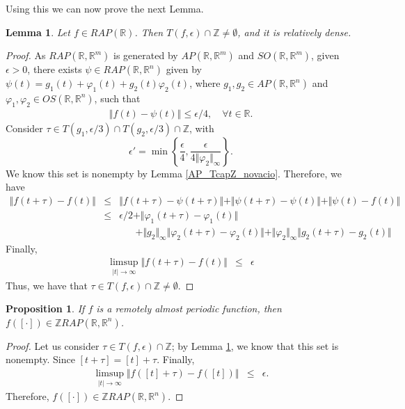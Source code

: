 \documentclass[english,,reqno]{amsart}
\numberwithin{equation}{section}
\theoremstyle{plain}
\newtheorem{lem}[thm]{Lemma}
\newtheorem{prop}[thm]{Proposition}
\theoremstyle{definition}
\theoremstyle{remark}
\begin{document}
Using this we can now prove the next Lemma.
\begin{lem}\label{RAP_TcapZ_novacio}
Let $f \in RAP(\mathbb{R})$. Then $T(f,\epsilon) \cap \mathbb{Z} \neq \emptyset$, and it is relatively dense.
\end{lem}
\begin{proof}
As $RAP(\mathbb{R},\mathbb{R}^{m})$ is generated by $AP(\mathbb{R},\mathbb{R}^{m})$ and $SO(\mathbb{R},\mathbb{R}^{m})$, given $\epsilon > 0$, there exists $\psi\in RAP(\mathbb{R},\mathbb{R}^n)$ given by $\psi(t) = g_1(t) + \varphi_1(t) + g_2(t)\varphi_2(t)$,  
where $g_1, g_2 \in AP(\mathbb{R}, \mathbb{R}^n)$ and $\varphi_1, \varphi_2 \in OS(\mathbb{R}, \mathbb{R}^n)$, such that  
\begin{eqnarray*}
\left\Vert f(t) - \psi(t) \right\Vert \leq \epsilon / 4, \quad \forall t\in \mathbb{R}.
\end{eqnarray*}  
Consider $\tau \in T(g_1, \epsilon/3) \cap T(g_2, \epsilon/3) \cap \mathbb{Z}$, with  
\[
\epsilon' = \min\left\{ \frac{\epsilon}{4}, \frac{\epsilon}{4\Vert \varphi_2\Vert_{\infty}} \right\}.
\]  
We know this set is nonempty by Lemma \ref{AP_TcapZ_novacio}.  
Therefore, we have
\begin{eqnarray*}
\Vert f(t+\tau)-f(t) \Vert 
&\leq & \Vert f(t+\tau)-\psi(t+\tau)\Vert + \Vert \psi(t+\tau)-\psi(t) \Vert + \Vert \psi(t)-f(t)\Vert \\
&\leq & \epsilon/2 + \Vert \varphi_{1}(t+\tau)- \varphi_{1}(t)\Vert \\
& & \quad \,\,\,\, +\Vert g_{2}\Vert_{\infty} \Vert \varphi_{2}(t+\tau)- \varphi_{2}(t)\Vert + \Vert \varphi_{2}\Vert_{\infty} \Vert g_{2}(t+\tau)-g_{2}(t)\Vert
\end{eqnarray*}
Finally,
\begin{eqnarray*}
\limsup_{\vert t\vert \rightarrow \infty} \Vert f(t+\tau)-f(t) \Vert 
&\leq & \epsilon
\end{eqnarray*}
Thus, we have that $\tau \in T(f, \epsilon) \cap \mathbb{Z} \neq \emptyset$.
\end{proof}

\begin{prop}
If $f$ is a remotely almost periodic function, then $f([\cdot]) \in \mathbb{Z}RAP(\mathbb{R}, \mathbb{R}^n)$.
\end{prop}
\begin{proof}
Let us consider $\tau \in T(f, \epsilon) \cap \mathbb{Z}$; by Lemma \ref{RAP_TcapZ_novacio}, we know that this set is nonempty.  
Since $[t+\tau] = [t] + \tau$.  
Finally,
\begin{eqnarray*}
\limsup_{\vert t\vert \rightarrow \infty} \Vert f([t]+\tau)-f([t]) \Vert 
&\leq & \epsilon.
\end{eqnarray*}
Therefore, $f([\cdot]) \in \mathbb{Z}RAP(\mathbb{R}, \mathbb{R}^n)$.
\end{proof}
\end{document}
